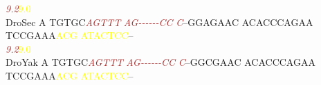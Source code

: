 \documentclass[11pt,twoside,reqno,a4paper]{article}
\begin{document}
{\hspace*{7\charwidth}\hspace*{1\charwidth}\hspace*{6\charwidth}\textit{\textcolor{Brown}{9.2}}\hspace*{1\charwidth}\hspace*{1\charwidth}\hspace*{1\charwidth}\hspace*{1\charwidth}\hspace*{39\charwidth}\textcolor{Yellow}{9.0}\hspace*{1\charwidth}\\
DroSec	A	TGTGC\textit{\textcolor{Brown}{A}}\textit{\textcolor{Brown}{G}}\textit{\textcolor{Brown}{T}}\textit{\textcolor{Brown}{T}}\textit{\textcolor{Brown}{T}}	\textit{\textcolor{Brown}{A}}\textit{\textcolor{Brown}{G}}\textit{\textcolor{Brown}{-}}\textit{\textcolor{Brown}{-}}\textit{\textcolor{Brown}{-}}\textit{\textcolor{Brown}{-}}\textit{\textcolor{Brown}{-}}\textit{\textcolor{Brown}{-}}\textit{\textcolor{Brown}{C}}\textit{\textcolor{Brown}{C}}	\textit{\textcolor{Brown}{C}}--GGAGAAC	ACACCCAGAA	TCCGAAA\textcolor{Yellow}{A}\textcolor{Yellow}{C}\textcolor{Yellow}{G}	\textcolor{Yellow}{A}\textcolor{Yellow}{T}\textcolor{Yellow}{A}\textcolor{Yellow}{C}\textcolor{Yellow}{T}\textcolor{Yellow}{C}\textcolor{Yellow}{C}--\\
\hspace*{7\charwidth}\hspace*{1\charwidth}\hspace*{6\charwidth}\textit{\textcolor{Brown}{9.2}}\hspace*{1\charwidth}\hspace*{1\charwidth}\hspace*{1\charwidth}\hspace*{1\charwidth}\hspace*{39\charwidth}\textcolor{Yellow}{9.0}\hspace*{1\charwidth}\\
DroYak	A	TGTGC\textit{\textcolor{Brown}{A}}\textit{\textcolor{Brown}{G}}\textit{\textcolor{Brown}{T}}\textit{\textcolor{Brown}{T}}\textit{\textcolor{Brown}{T}}	\textit{\textcolor{Brown}{A}}\textit{\textcolor{Brown}{G}}\textit{\textcolor{Brown}{-}}\textit{\textcolor{Brown}{-}}\textit{\textcolor{Brown}{-}}\textit{\textcolor{Brown}{-}}\textit{\textcolor{Brown}{-}}\textit{\textcolor{Brown}{-}}\textit{\textcolor{Brown}{C}}\textit{\textcolor{Brown}{C}}	\textit{\textcolor{Brown}{C}}--GGCGAAC	ACACCCAGAA	TCCGAAA\textcolor{Yellow}{A}\textcolor{Yellow}{C}\textcolor{Yellow}{G}	\textcolor{Yellow}{A}\textcolor{Yellow}{T}\textcolor{Yellow}{A}\textcolor{Yellow}{C}\textcolor{Yellow}{T}\textcolor{Yellow}{C}\textcolor{Yellow}{C}--\\
}
\end{document}
